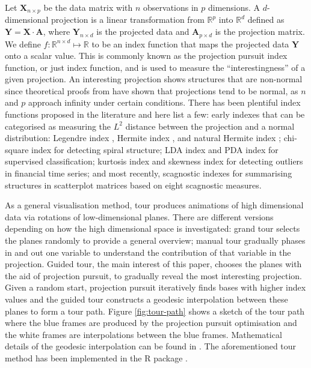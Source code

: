 Let \(\mathbf{X}_{n \times p}\) be the data matrix with \(n\)
observations in \(p\) dimensions. A \(d\)-dimensional projection is a
linear transformation from \(\mathbb{R}^p\) into \(\mathbb{R}^d\)
defined as \(\mathbf{Y} = \mathbf{X} \cdot \mathbf{A}\), where
\(\mathbf{Y}_{n \times d}\) is the projected data and
\(\mathbf{A}_{p\times d}\) is the projection matrix. We define
\(f: \mathbb{R}^{n \times d} \mapsto \mathbb{R}\) to be an index
function that maps the projected data \(\mathbf{Y}\) onto a scalar
value. This is commonly known as the projection pursuit index function,
or just index function, and is used to measure the ``interestingness''
of a given projection. An interesting projection shows structures that
are non-normal since theoretical proofs from
\citet{diaconis1984asymptotics} have shown that projections tend to be
normal, as \(n\) and \(p\) approach infinity under certain conditions.
There has been plentiful index functions proposed in the literature and
here list a few: early indexes that can be categorised as measuring the
\(L^2\) distance between the projection and a normal distribution:
Legendre index \citep{friedman1974projection}, Hermite index
\citep{hall1989polynomial}, and natural Hermite index
\citep{cook1993projection}; chi-square index \citep{posse1995projection}
for detecting spiral structure; LDA index\citep{lee2005projection} and
PDA \citep{lee2010projection} index for supervised classification;
kurtosis index \citep{Loperfido2020} and skewness index
\citep{Loperfido2018} for detecting outliers in financial time series;
and most recently, scagnostic indexes \citep{laa2020using} for
summarising structures in scatterplot matrices based on eight scagnostic
measures.

As a general visualisation method, tour produces animations of high
dimensional data via rotations of low-dimensional planes. There are
different versions depending on how the high dimensional space is
investigated: grand tour \citep{cook2008grand} selects the planes
randomly to provide a general overview; manual tour
\citep{cook1997manual} gradually phases in and out one variable to
understand the contribution of that variable in the projection. Guided
tour, the main interest of this paper, chooses the planes with the aid
of projection pursuit, to gradually reveal the most interesting
projection. Given a random start, projection pursuit iteratively finds
bases with higher index values and the guided tour constructs a geodesic
interpolation between these planes to form a tour path. Figure
\ref{fig:tour-path} shows a sketch of the tour path where the blue
frames are produced by the projection pursuit optimisation and the white
frames are interpolations between the blue frames. Mathematical details
of the geodesic interpolation can be found in
\citet{buja2005computational}. The aforementioned tour method has been
implemented in the R package  \citep{tourr}.

